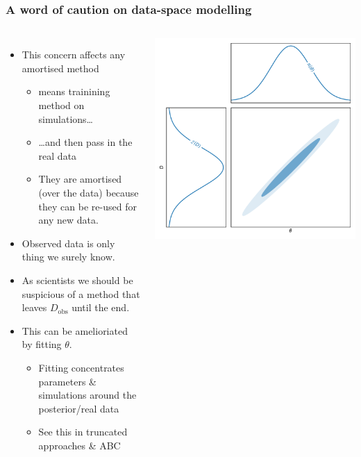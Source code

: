 \documentclass[aspectratio=169]{beamer}
\begin{document}
\begin{frame}
    \frametitle{A word of caution on data-space modelling}
            \begin{columns}
    \begin{itemize}
        \item This concern affects any amortised method 
            \begin{itemize}
                \item means trainining method on simulations\ldots
                \item \ldots and then pass in the real data
                \item They are amortised (over the data) because they can be re-used for any new data.
            \end{itemize}
        \item Observed data is only thing we surely know.
        \item As scientists we should be suspicious of a method that leaves $D_\mathrm{obs}$ until the end.
        \item This can be amelioriated by fitting $\theta$.
            \begin{itemize}
                \item Fitting concentrates parameters \& simulations around the posterior/real data
                \item See this in truncated approaches \& ABC
            \end{itemize}
    \end{itemize}
                \includegraphics[page=6, width=\textwidth]{figures/sbi_parameter_estimation.pdf}%
            \end{columns}

\end{frame}
\end{document}
